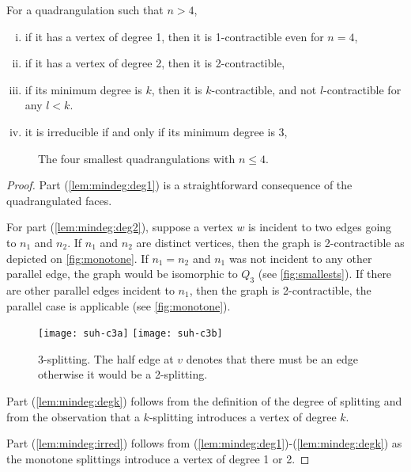 \documentclass[]{article}
\begin{document}
\begin{prop}
\label{lem:mindeg}
For a quadrangulation such that $n>4$,
\begin{enumerate}[(i)]
\item 
  \label{lem:mindeg:deg1}
  if it has a vertex of degree 1, then it is 1-contractible even for $n=4$,
\item
  \label{lem:mindeg:deg2}
  if it has a vertex of degree 2, then it is 2-contractible,
\item
\label{lem:mindeg:degk}
  if its minimum degree is $k$, then it is $k$-contractible, and not $l$-contractible for any $l<k$.
\item
\label{lem:mindeg:irred}
  it is irreducible if and only if its minimum degree is 3,
\end{enumerate}
\end{prop}
\begin{figure}\centering
{}
\qquad
{}
\qquad
{}
\qquad
{}
\caption{The four smallest quadrangulations with $n\leq 4$.}
\label{fig:smallests}
\end{figure}
\begin{proof}
 Part (\ref*{lem:mindeg:deg1}) is a straightforward consequence of the quadrangulated faces.

For part (\ref*{lem:mindeg:deg2}), suppose a vertex $w$ is incident to two edges going to $n_1$ and $n_2$.
If $n_1$ and $n_2$ are distinct vertices, then the graph is 2-contractible as depicted on \autoref{fig:monotone}.
If $n_1=n_2$ and $n_1$ was not incident to any other parallel edge, the graph would be isomorphic to $Q_3$ (see \autoref{fig:smallests}).
If there are other parallel edges incident to $n_1$, then the graph is 2-contractible, the parallel case is applicable (see \autoref{fig:monotone}).

\begin{figure}\centering
  \texttt{[image: suh-c3a]}
\qquad
  \texttt{[image: suh-c3b]}
  \caption{3-splitting. The half edge at $v$ denotes that there must be an edge otherwise it would be a 2-splitting.}
  \label{fig:3splitting}
\end{figure}

Part (\ref*{lem:mindeg:degk}) follows from the definition of the degree of splitting and from the observation that a $k$-splitting introduces a vertex of degree $k$.

Part (\ref*{lem:mindeg:irred}) follows from (\ref*{lem:mindeg:deg1})-(\ref*{lem:mindeg:degk}) as the monotone splittings introduce a vertex of degree 1 or 2.
\end{proof}
\end{document}
